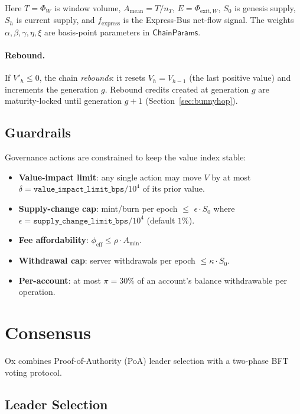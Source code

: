 \documentclass[11pt,a4paper]{article}
\theoremstyle{definition}
\newcommand{\ox}{\textsf{Ox}}
\newcommand{\poa}{\textsf{PoA}}
\newcommand{\ChainParams}{\textsf{ChainParams}}
\begin{document}
Here $T = \Phi_W$ is window volume, $A_{\mathrm{mean}} = T/n_T$, $E=\Phi_{\mathrm{exit},W}$,
$S_0$ is genesis supply, $S_h$ is current supply, and $f_{\mathrm{express}}$
is the Express-Bus net-flow signal.  The weights $\alpha,\beta,\gamma,\eta,\xi$
are basis-point parameters in $\ChainParams$.

\paragraph{Rebound.}
If $V'_h \le 0$, the chain \emph{rebounds}: it resets
$V_h = V_{h-1}$ (the last positive value) and increments the generation $g$.
Rebound credits created at generation $g$ are maturity-locked until
generation $g+1$ (Section~\ref{sec:bunnyhop}).

\subsection{Guardrails}
\label{sec:guardrails}

Governance actions are constrained to keep the value index stable:
\begin{itemize}[leftmargin=2em]
  \item \textbf{Value-impact limit}: any single action may move $V$ by at most
    $\delta = \texttt{value\_impact\_limit\_bps}/10^{4}$ of its prior value.
  \item \textbf{Supply-change cap}: mint/burn per epoch $\le$
    $\epsilon\cdot S_0$ where $\epsilon = \texttt{supply\_change\_limit\_bps}/10^{4}$
    (default $1\%$).
  \item \textbf{Fee affordability}: $\phi_{\mathrm{eff}} \le \rho\cdot A_{\min}$.
  \item \textbf{Withdrawal cap}: server withdrawals per epoch $\le \kappa\cdot S_0$.
  \item \textbf{Per-account}: at most $\pi = 30\%$ of an account's balance
    withdrawable per operation.
\end{itemize}

\section{Consensus}
\label{sec:consensus}

\ox{} combines Proof-of-Authority (\poa{}) leader selection with a two-phase
BFT voting protocol.

\subsection{Leader Selection}
\end{document}
